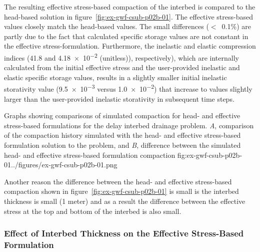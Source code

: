 The resulting effective stress-based compaction of the interbed is compared to the head-based solution in figure~\ref{fig:ex-gwf-csub-p02b-01}. The effective stress-based values closely match the head-based values. The small differences ($<$~0.1\%) are partly due to the fact that calculated specific storage values are not constant in the effective stress-formulation. Furthermore, the inelastic and elastic compression indices (41.8 and \num{4.18e-2} (unitless)), respectively), which are internally calculated from the initial effective stress and the user-provided inelastic and elastic specific storage values, results in a slightly smaller initial inelastic storativity value (\num{9.5e-3} versus \num{1.0e-2}) that increase to values slightly larger than the user-provided inelastic storativity in subsequent time steps.

\begin{StandardFigure}{
                                     Graphs showing comparisons of simulated compaction for head- and 
                                     effective stress-based formulations for the delay interbed drainage 
                                     problem. \textit{A}, comparison of the compaction history simulated 
                                     with the head- and effective stress-based formulation solution to 
                                     the problem, and \textit{B}, difference between the simulated head- 
                                     and effective stress-based formulation compaction
                                     }{fig:ex-gwf-csub-p02b-01}{../figures/ex-gwf-csub-p02b-01.png}
\end{StandardFigure}         

Another reason the difference between the head- and effective stress-based compaction shown in figure~\ref{fig:ex-gwf-csub-p02b-01} is small is the interbed thickness is small (1 meter) and as a result the difference between the effective stress at the top and bottom of the interbed is also small. 

\subsubsection{Effect of Interbed Thickness on the Effective Stress-Based Formulation}

